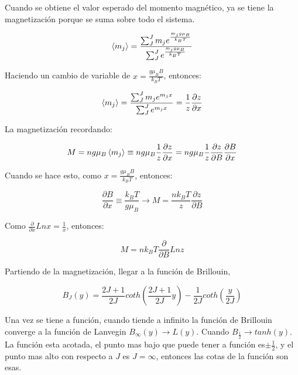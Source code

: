 \documentclass[11pt,fleqn]{book}
\begin{document}
Cuando se obtiene el valor esperado del momento magnético, ya se tiene la magnetización porque se suma sobre todo el sistema.

\begin{equation}
    \braket{m_{j}}=\frac{\sum_{J}^{J}m_{j}e^{\frac{m_{j}g\mu_{B}}{k_{B}T}}}{\sum_{J}^{J}e^{\frac{m_{j}g\mu_{B}}{k_{B}T}}}
    \label{Eq. 3.28}
\end{equation}

Haciendo un cambio de variable de $x=\frac{g\mu_{B}B}{k_{B}T}$, entonces:

\begin{equation}
    \braket{m_{j}}=\frac{\sum_{J}^{J}m_{j}e^{m_{j}x}}{\sum_{J}^{J}e^{m_{j}x}}=\frac{1}{z}\frac{\partial z}{\partial x}
    \label{Eq. 3.29}
\end{equation}

La magnetización recordando:

\begin{equation*}
    M=ng\mu_{B}\braket{m_{j}}\equiv ng\mu_{B}\frac{1}{z}\frac{\partial z}{\partial x}=ng\mu_{B}\frac{1}{z}\frac{\partial z}{\partial B}\frac{\partial B}{\partial x}
\end{equation*}
    
Cuando se hace esto, como $x=\frac{g\mu_{B}B}{k_{B}T}$, entonces:

\begin{equation*}
    \frac{\partial B}{\partial x}\equiv \frac{k_{B}T}{g\mu_{B}}\longrightarrow M=\frac{nk_{B}T}{z}\frac{\partial z}{\partial B}
\end{equation*}
     
Como $\frac{\partial}{\partial x} Ln x=\frac{1}{x}$, entonces:

\begin{equation}
    M=nk_{B}T\frac{\partial}{\partial B} Ln z
    \label{Eq. 3.30}
\end{equation}

\begin{exercise}[$M\longrightarrow B(\mu)$]
Partiendo de la magnetización, llegar a la función de Brillouin,

\begin{equation*}
    B_{J}(y)=\frac{2J+1}{2J}coth\left(\frac{2J+1}{2J}y\right)-\frac{1}{2J}coth\left(\frac{y}{2J}\right)
\end{equation*}
\end{exercise}

Una vez se tiene a función, cuando tiende a infinito la función de Brillouin converge a la función de Lanvegin $B_{\infty}(y)\longrightarrow L(y)$. Cuando $B_{\frac{1}{2}}\longrightarrow tanh(y)$. La función esta acotada, el punto mas bajo que puede tener a función es$\pm\frac{1}{2}$, y el punto mas alto con respecto a $J$ es $J=\infty$, entonces las cotas de la función son esas.
\end{document}
